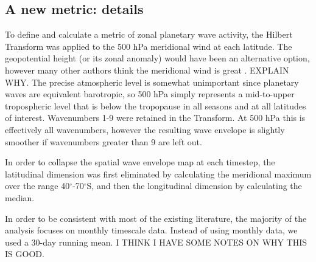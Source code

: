 \subsection{A new metric: details}

To define and calculate a metric of zonal planetary wave activity, the Hilbert Transform was applied to the 500 hPa meridional wind at each latitude. The geopotential height (or its zonal anomaly) would have been an alternative option, however many other authors think the meridional wind is great \citep[e.g.][p.365]{Hope2014}. EXPLAIN WHY. The precise atmospheric level is somewhat unimportant since planetary waves are equivalent barotropic, so 500 hPa simply represents a mid-to-upper tropospheric level that is below the tropopause in all seasons and at all latitudes of interest. Wavenumbers 1-9 were retained in the Transform. At 500 hPa this is effectively all wavenumbers, however the resulting wave envelope is slightly smoother if wavenumbers greater than 9 are left out.

In order to collapse the spatial wave envelope map at each timestep, the latitudinal dimension was first eliminated by calculating the meridional maximum over the range 40$^{\circ}$-70$^{\circ}$S, and then the longitudinal dimension by calculating the median.

In order to be consistent with most of the existing literature, the majority of the analysis focuses on monthly timescale data. Instead of using monthly data, we used a 30-day running mean. I THINK I HAVE SOME NOTES ON WHY THIS IS GOOD.

